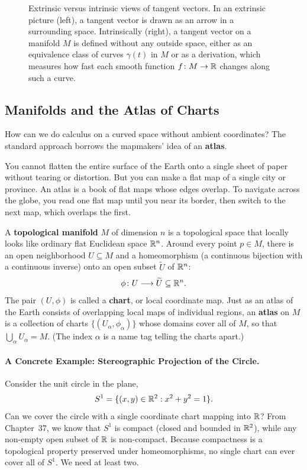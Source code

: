\begin{figure}[htbp]
\caption{Extrinsic versus intrinsic views of tangent vectors. In an extrinsic picture (left), a tangent vector is drawn as an arrow in a surrounding space. Intrinsically (right), a tangent vector on a manifold $M$ is defined without any outside space, either as an equivalence class of curves $\gamma(t)$ in $M$ or as a derivation, which measures how fast each smooth function $f \colon M \to \mathbb{R}$ changes along such a curve.}\label{geom:fig-tangent-derivation}
\end{figure}

\subsection{Manifolds and the Atlas of Charts}

How can we do calculus on a curved space without ambient coordinates? The standard approach borrows the mapmakers' idea of an \textbf{atlas}.

You cannot flatten the entire surface of the Earth onto a single sheet of paper without tearing or distortion. But you can make a flat map of a single city or province. An atlas is a book of flat maps whose edges overlap. To navigate across the globe, you read one flat map until you near its border, then switch to the next map, which overlaps the first.

A \textbf{topological manifold} $M$ of dimension $n$ is a topological space that locally looks like ordinary flat Euclidean space $\mathbb{R}^n$. Around every point $p \in M$, there is an open neighborhood $U \subseteq M$ and a homeomorphism (a continuous bijection with a continuous inverse) onto an open subset $\widetilde{U}$ of $\mathbb{R}^n$:
\[
\phi \colon U \longrightarrow \widetilde{U} \subseteq \mathbb{R}^n.
\]
The pair $(U, \phi)$ is called a \textbf{chart}, or local coordinate map. Just as an atlas of the Earth consists of overlapping local maps of individual regions, an \textbf{atlas} on $M$ is a collection of charts $\{(U_\alpha, \phi_\alpha)\}$ whose domains cover all of $M$, so that $\bigcup_\alpha U_\alpha = M$. (The index $\alpha$ is a name tag telling the charts apart.)

\paragraph{A Concrete Example: Stereographic Projection of the Circle.}
Consider the unit circle in the plane,
\[
S^1 = \{(x, y) \in \mathbb{R}^2 : x^2 + y^2 = 1\}.
\]
Can we cover the circle with a single coordinate chart mapping into $\mathbb{R}$? From Chapter~37, we know that $S^1$ is compact (closed and bounded in $\mathbb{R}^2$), while any non-empty open subset of $\mathbb{R}$ is non-compact. Because compactness is a topological property preserved under homeomorphisms, no single chart can ever cover all of $S^1$. We need at least two.

